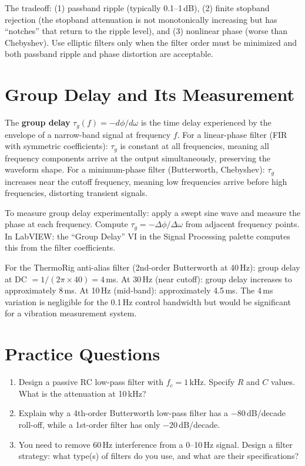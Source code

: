 \documentclass[11pt,letterpaper,twoside,openany]{book}
\begin{document}
The tradeoff: (1) passband ripple (typically 0.1--1\,dB), (2) finite stopband rejection (the stopband attenuation is not monotonically increasing but has ``notches'' that return to the ripple level), and (3) nonlinear phase (worse than Chebyshev). Use elliptic filters only when the filter order must be minimized and both passband ripple and phase distortion are acceptable.

\section{Group Delay and Its Measurement}
The \textbf{group delay} $\tau_g(f) = -d\phi/d\omega$ is the time delay experienced by the envelope of a narrow-band signal at frequency $f$. For a linear-phase filter (FIR with symmetric coefficients): $\tau_g$ is constant at all frequencies, meaning all frequency components arrive at the output simultaneously, preserving the waveform shape. For a minimum-phase filter (Butterworth, Chebyshev): $\tau_g$ increases near the cutoff frequency, meaning low frequencies arrive before high frequencies, distorting transient signals.

To measure group delay experimentally: apply a swept sine wave and measure the phase at each frequency. Compute $\tau_g = -\Delta\phi/\Delta\omega$ from adjacent frequency points. In LabVIEW: the ``Group Delay'' VI in the Signal Processing palette computes this from the filter coefficients.

For the ThermoRig anti-alias filter (2nd-order Butterworth at 40\,Hz): group delay at DC $= 1/(2\pi \times 40) = 4$\,ms. At 30\,Hz (near cutoff): group delay increases to approximately 8\,ms. At 10\,Hz (mid-band): approximately 4.5\,ms. The 4\,ms variation is negligible for the 0.1\,Hz control bandwidth but would be significant for a vibration measurement system.
\section{Practice Questions}
\begin{enumerate}[leftmargin=1.5em]
\item Design a passive RC low-pass filter with $f_c = 1$\,kHz. Specify $R$ and $C$ values. What is the attenuation at 10\,kHz?
\item Explain why a 4th-order Butterworth low-pass filter has a $-80$\,dB/decade roll-off, while a 1st-order filter has only $-20$\,dB/decade.
\item You need to remove 60\,Hz interference from a 0--10\,Hz signal. Design a filter strategy: what type(s) of filters do you use, and what are their specifications?
\end{enumerate}
\end{document}
